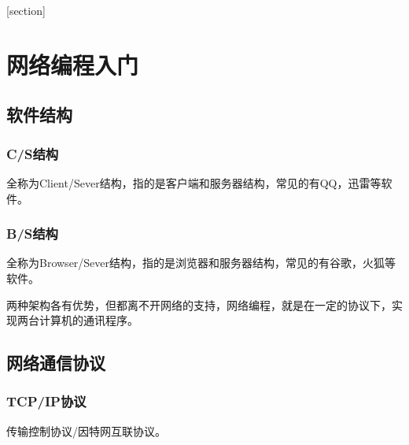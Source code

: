 \documentclass[a4paper]{report}
\begin{document}
\flushbottom%
\newcommand{\dm}[1]{\colorbox{wgray}{\lstinline`#1`}}
\newcommand{\myroman}[1]{\uppercase\expandafter{\romannumeral#1}}
[section] \renewcommand{\thenum}{\arabic{num}.} \newcommand{\num}{\refstepcounter{num}\text{\thenum}}

\newenvironment{tips}{\kaishu\zihao{-6}\color{blue}{\noindent\rule[-3pt]{\textwidth}{0.5pt}\par \em \noindent {\zihao{-5} \textcolor[rgb]{1.00,0.00,0.00}{Tips}}}\par}{\\ \rule[3mm]{\textwidth}{0.5pt}\par}

\newenvironment{zhengming}{\kaishu\zihao{-5}\color{blue}{\noindent\em 证明：}\par}{\hfill $\diamondsuit$\par}

\tableofcontents
{}%
\clearpage
{}%

\chapter{网络编程入门}
\section{软件结构}
\subsection{C/S结构}
全称为Client/Sever结构，指的是客户端和服务器结构，常见的有QQ，迅雷等软件。
\subsection{B/S结构}
全称为Browser/Sever结构，指的是浏览器和服务器结构，常见的有谷歌，火狐等软件。

两种架构各有优势，但都离不开网络的支持，网络编程，就是在一定的协议下，实现两台计算机的通讯程序。
\section{网络通信协议}
\subsection{TCP/IP协议}
传输控制协议/因特网互联协议。
\end{document}
